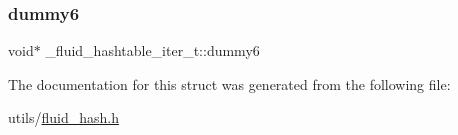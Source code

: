 \mbox{\label{struct__fluid__hashtable__iter__t_ae09389dba11644fbfb6183416e889fd2}} 
\subsubsection{\texorpdfstring{dummy6}{dummy6}}
{\footnotesize\ttfamily void$\ast$ \+\_\+fluid\+\_\+hashtable\+\_\+iter\+\_\+t\+::dummy6}



The documentation for this struct was generated from the following file\+:\begin{DoxyCompactItemize}
\item 
utils/\hyperlink{fluid__hash_8h}{fluid\+\_\+hash.\+h}\end{DoxyCompactItemize}
